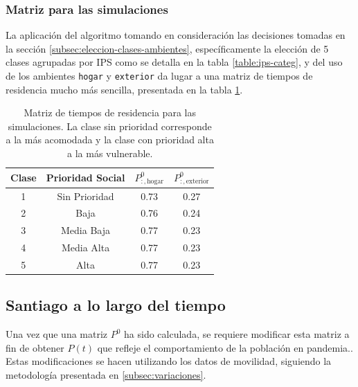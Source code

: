 \subsubsection*{Matriz para las simulaciones}\label{res:matrix-normal-simulaciones}

La aplicación del algoritmo tomando en consideración las decisiones tomadas en la sección \ref{subsec:eleccion-clases-ambientes}, específicamente la elección de 5 clases agrupadas por IPS como se detalla en la tabla \ref{table:ips-categ}, y del uso de los ambientes \texttt{hogar} y \texttt{exterior} da lugar a una matriz de tiempos de residencia mucho más sencilla, presentada en la tabla \ref{table:matrix-simulaciones}.

\begin{table}[h!]
\centering
\begin{tabular}{||c c | c c ||} 
 \hline
 \textbf{Clase} & \textbf{Prioridad Social} &  \(P^0_{:,\text{hogar}}\) & \(P^0_{:,\text{exterior}}\)\\[1ex] 
 \hline
 1 & Sin Prioridad  & 0.73  & 0.27 \\ 
 2 & Baja           & 0.76  & 0.24 \\
 3 & Media Baja     & 0.77  & 0.23 \\
 4 & Media Alta     & 0.77  & 0.23 \\
 5 & Alta           & 0.77  & 0.23 \\ 
 \hline
\end{tabular}
\caption[Matriz de tiempos de residencia para las simulaciones.]{Matriz de tiempos de residencia para las simulaciones. La clase sin prioridad corresponde a la más acomodada y la clase con prioridad alta a la más vulnerable.}
\label{table:matrix-simulaciones}
\end{table}

\subsection{Santiago a lo largo del tiempo} \label{res:matrix-pandemia}

Una vez que una matriz \(P^0\) ha sido calculada, se requiere modificar esta matriz a fin de obtener \(P(t)\) que refleje el comportamiento de la población en pandemia.. Estas modificaciones se hacen utilizando los datos de movilidad, siguiendo la metodología presentada en \ref{subsec:variaciones}.


